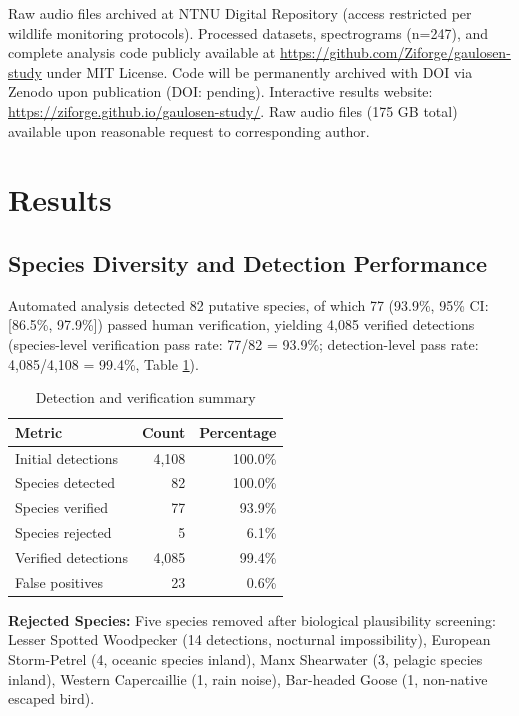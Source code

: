 \documentclass[twocolumn]{article}
\begin{document}
Raw audio files archived at NTNU Digital Repository (access restricted per wildlife monitoring protocols). Processed datasets, spectrograms (n=247), and complete analysis code publicly available at \url{https://github.com/Ziforge/gaulosen-study} under MIT License. Code will be permanently archived with DOI via Zenodo upon publication (DOI: pending). Interactive results website: \url{https://ziforge.github.io/gaulosen-study/}. Raw audio files (175 GB total) available upon reasonable request to corresponding author.

\section{Results}

\subsection{Species Diversity and Detection Performance}

Automated analysis detected 82 putative species, of which 77 (93.9\%, 95\% CI: [86.5\%, 97.9\%]) passed human verification, yielding 4,085 verified detections (species-level verification pass rate: 77/82 = 93.9\%; detection-level pass rate: 4,085/4,108 = 99.4\%, Table \ref{tab:verification}).

\begin{table}[H]
\centering
\caption{Detection and verification summary}
\label{tab:verification}
\begin{tabular}{lrr}
\toprule
\textbf{Metric} & \textbf{Count} & \textbf{Percentage} \\
\midrule
Initial detections & 4,108 & 100.0\% \\
Species detected & 82 & 100.0\% \\
Species verified & 77 & 93.9\% \\
Species rejected & 5 & 6.1\% \\
Verified detections & 4,085 & 99.4\% \\
False positives & 23 & 0.6\% \\
\bottomrule
\end{tabular}
\end{table}

\textbf{Rejected Species:} Five species removed after biological plausibility screening: Lesser Spotted Woodpecker (14 detections, nocturnal impossibility), European Storm-Petrel (4, oceanic species inland), Manx Shearwater (3, pelagic species inland), Western Capercaillie (1, rain noise), Bar-headed Goose (1, non-native escaped bird).
\end{document}
